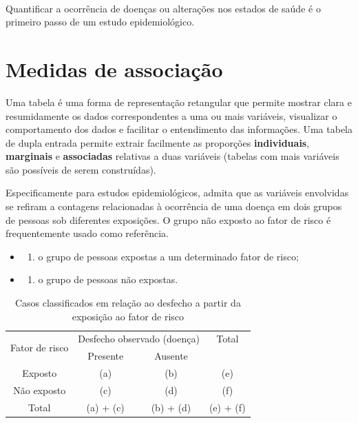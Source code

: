 \documentclass[
]{book}
\providecommand{\tightlist}{%
  \setlength{\itemsep}{0pt}\setlength{\parskip}{0pt}}
\begin{document}
~

Quantificar a ocorrência de doenças ou alterações nos estados de saúde é o primeiro passo de um estudo epidemiológico.

\hfill\break

\hypertarget{medidas-de-associauxe7uxe3o}{%
\section{Medidas de associação}\label{medidas-de-associauxe7uxe3o}}

\hfill\break

Uma tabela é uma forma de representação retangular que permite mostrar clara e resumidamente os dados correspondentes a uma ou mais variáveis, visualizar o comportamento dos dados e facilitar o entendimento das informações. Uma tabela de dupla entrada permite extrair facilmente as proporções \textbf{individuais}, \textbf{marginais} e \textbf{associadas} relativas a duas variáveis (tabelas com mais variáveis são possíveis de serem construídas).

\hfill\break

Especificamente para estudos epidemiológicos, admita que as variáveis envolvidas se refiram a contagens relacionadas à ocorrência de uma doença em dois grupos de pessoas sob diferentes exposições. O grupo não exposto ao fator de risco é frequentemente usado como referência.

\hfill\break

\begin{itemize}
\item
  \begin{enumerate}
  \def\labelenumi{(\alph{enumi})}
  \tightlist
  \item
    o grupo de pessoas expostas a um determinado fator de risco;
  \end{enumerate}
\item
  \begin{enumerate}
  \def\labelenumi{(\alph{enumi})}
  \setcounter{enumi}{1}
  \tightlist
  \item
    o grupo de pessoas não expostas.
  \end{enumerate}
\end{itemize}

\hfill\break

\begin{table}[h]
\centering
\caption{Casos classificados em relação ao desfecho a partir da exposição ao fator de risco}
\begin{tabular}{c|c|c|c}
\hline
\multirow{2}{*}{Fator de risco} & \multicolumn{2}{c|}{Desfecho observado (doença)} & Total \\ \cline{2-3}
             & Presente  & Ausente  &     \\ 
\hline              
Exposto & (a) &  (b)   & (e) \\
\hline 
Não exposto & (c) &  (d) & (f)  \\
\hline 
Total & (a) + (c)  & (b) + (d) & (e) + (f) \\
\hline 
\end{tabular}
\label{tab3}
\end{table} 
\end{document}
